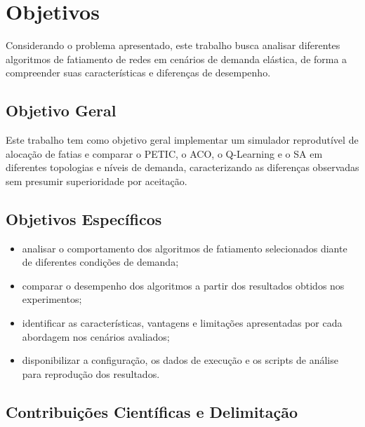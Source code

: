 \section{Objetivos}

Considerando o problema apresentado, este trabalho busca analisar diferentes algoritmos de fatiamento de redes em cenários de demanda elástica, de forma a compreender suas características e diferenças de desempenho.

\subsection{Objetivo Geral}

Este trabalho tem como objetivo geral implementar um simulador reprodutível de alocação de fatias e comparar o PETIC, o ACO, o Q-Learning e o SA em diferentes topologias e níveis de demanda, caracterizando as diferenças observadas sem presumir superioridade por aceitação.

\subsection{Objetivos Específicos}

\begin{itemize}
    \item analisar o comportamento dos algoritmos de fatiamento selecionados diante de diferentes condições de demanda;
    
    \item comparar o desempenho dos algoritmos a partir dos resultados obtidos nos experimentos;
    
    \item identificar as características, vantagens e limitações apresentadas por cada abordagem nos cenários avaliados;
    
    \item disponibilizar a configuração, os dados de execução e os scripts de análise para reprodução dos resultados.
\end{itemize}

\subsection{Contribuições Científicas e Delimitação}

